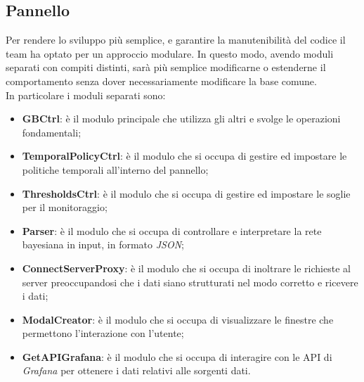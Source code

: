 \subsection{Pannello}\label{archPannello}
Per rendere lo sviluppo più semplice, e garantire la manutenibilità del codice il team ha optato per un approccio modulare. In questo modo, avendo moduli separati con compiti distinti, sarà più semplice modificarne o estenderne il comportamento senza dover necessariamente modificare la base comune.\\
In particolare i moduli separati sono:
\begin{itemize}
	\item \textbf{GBCtrl}: è il modulo principale che utilizza gli altri e svolge le operazioni fondamentali;
	\item \textbf{TemporalPolicyCtrl}: è il modulo che si occupa di gestire ed impostare le politiche temporali all'interno del pannello;
	\item \textbf{ThresholdsCtrl}: è il modulo che si occupa di gestire ed impostare le soglie per il monitoraggio;
	\item \textbf{Parser}: è il modulo che si occupa di controllare e interpretare la rete bayesiana in input, in formato \textit{JSON};
	\item \textbf{ConnectServerProxy}: è il modulo che si occupa di inoltrare le richieste al server preoccupandosi che i dati siano strutturati nel modo corretto e ricevere i dati;
	\item \textbf{ModalCreator}: è il modulo che si occupa di visualizzare le finestre che permettono l'interazione con l'utente;
	\item \textbf{GetAPIGrafana}: è il modulo che si occupa di interagire con le API di \textit{Grafana} per ottenere i dati relativi alle sorgenti dati.
\end{itemize}

